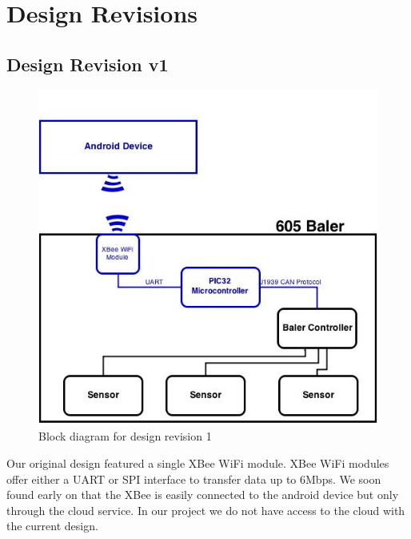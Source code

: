 \documentclass[paper=a4, fontsize=11pt]{scrartcl}
\numberwithin{equation}{section}		%
\numberwithin{figure}{section}			%
\numberwithin{table}{section}				%
\begin{document}
\section{Design Revisions}
\subsection{Design Revision v1} 
 \begin{figure}[ht]
	 \center\includegraphics[scale=0.5]{rev1.jpg}
 \caption{Block diagram for design revision 1}
 \end{figure}
Our original design featured a single XBee WiFi module. XBee WiFi modules offer either a UART or SPI interface to transfer data up to 6Mbps. We soon found early on that the XBee is easily connected to the android device but only through the cloud service. In our project we do not have access to the cloud with the current design.\\
\end{document}

